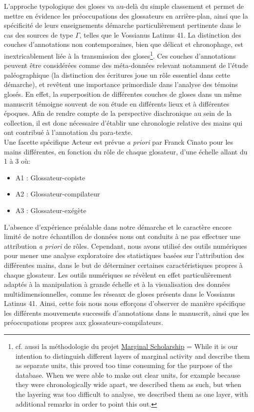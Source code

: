 \documentclass[a4paper, twoside, 12pt]{book}
\begin{document}
{L'approche typologique des gloses va au-delà du simple classement et permet de mettre en évidence les préoccupations des glossateurs en arrière-plan, ainsi que la spécificité de leurs enseignements \cite{cinato2011perspectives} démarche particulièrement pertinente dans le cas des sources de type $\Gamma$, telles que le Vossianus Latinus 41. La distinction des couches d'annotations non contemporaines, bien que délicat et chronophage, est inextricablement liée à la transmission des gloses\footnote{cf. aussi la méthodologie du projet \href{https://www.marginalscholarship.nl/what-is-this/about-the-data-recorded-here/}{Marginal Scholarship} = \og{} While it is our intention to distinguish different layers of marginal activity and describe them as separate units, this proved too time consuming for the purpose of the database. When we were able to make out clear units, for example because they were chronologically wide apart, we described them as such, but when the layering was too difficult to analyse, we described them as one layer, with additional remarks in order to point this out.\fg{}}. Ces couches d'annotations peuvent être considérées comme des méta-données relevant notamment de l'étude paléographique (la distinction des écritures joue un rôle essentiel dans cette démarche), et revêtent une importance primordiale dans l'analyse des témoins glosés. En effet, la superposition de différentes couches de gloses dans un même manuscrit témoigne souvent de son étude en différents lieux et à différentes époques. Afin de rendre compte de la perspective diachronique au sein de la collection, il est donc nécessaire d'établir une chronologie relative des mains qui ont contribué à l'annotation du para-texte.\\

Une facette spécifique \og{} Acteur \fg{} est prévue \textit{a priori} par Franck Cinato pour les mains différentes, en fonction du rôle de chaque glosateur, d'une échelle allant du 1 à 3 où:

\begin{itemize}
    \item A1 : Glossateur-copiste
    \item A2 : Glossateur-compilateur
    \item A3 : Glossateur-exégète
\end{itemize}


L'absence d'expérience préalable dans notre démarche et le caractère encore limité de notre échantillon de données nous ont conduits à ne pas effectuer une attribution \textit{a priori} de rôles. Cependant, nous avons utilisé des outils numériques pour mener une analyse exploratoire des statistiques basées sur l'attribution des différentes mains, dans le but de déterminer certaines caractéristiques propres à chaque glosateur. Les outils numériques se révèlent en effet particulièrement adaptés à la manipulation à grande échelle et à la visualisation des données multidimensionnelles, comme les réseaux de gloses présents dans le Vossianus Latinus 41. Ainsi, cette fois nous nous efforçons d'observer de manière spécifique les différents mouvements successifs d'annotations dans le manuscrit, ainsi que les préoccupations propres aux glossateurs-compilateurs.\\

}
\end{document}
